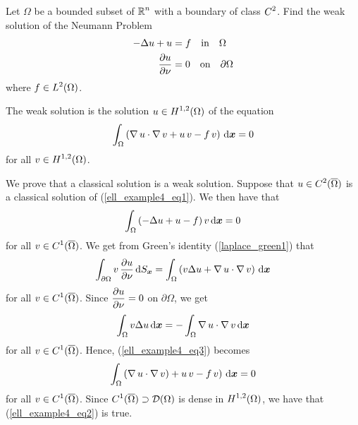 \begin{egg}
Let $\Omega$ be a bounded subset of $\displaystyle \mathbb{R}^n$ with a
boundary of class $\displaystyle C^2$.
Find the weak solution of the Neumann Problem          \label{eggNewmanBdr}
\begin{equation} \label{ell_example4_eq1}
\begin{split}
-\Delta u + u &= f \quad \text{in} \quad \Omega \\
\frac{\partial{u}}{\partial \nu} &= 0 \quad \text{on} \quad \partial \Omega
\end{split}
\end{equation}
where $\displaystyle f \in L^2(\Omega)$.

The weak solution is the solution $\displaystyle u\in H^{1,2}(\Omega)$ of
the equation
\begin{equation} \label{ell_example4_eq2}
\int_\Omega \left( \operatorname{\nabla} u \cdot \operatorname{\nabla} v
+ u\, v - f\, v \right) \,\mathrm{d}{{\bm{x}}} = 0
\end{equation}
for all $\displaystyle v \in H^{1,2}(\Omega)$.

We prove that a classical solution is a weak solution.  Suppose that
$\displaystyle u \in C^2(\overline{\Omega})$ is a classical solution of
(\ref{ell_example4_eq1}).  We then have that
\begin{equation} \label{ell_example4_eq3}
\int_\Omega \left( -\Delta u + u - f\right)
v \,\mathrm{d}{{\bm{x}}} = 0
\end{equation}
for all $\displaystyle v \in C^1(\overline{\Omega})$.
We get from Green's identity (\ref{laplace_green1}) that
\[
\int_{\partial \Omega} v\,\frac{\partial{u}}{\partial \nu} \,\mathrm{d}{S}_{{\bm{x}}}
= \int_\Omega \left( v \Delta u + \operatorname{\nabla} u \cdot \operatorname{\nabla} v \right)
\,\mathrm{d}{{\bm{x}}}
\]
for all $\displaystyle v \in C^1(\overline{\Omega})$.
Since $\displaystyle \frac{\partial{u}}{\partial \nu} = 0$ on $\partial \Omega$, we
get
\[
\int_\Omega  v \Delta u \,\mathrm{d}{{\bm{x}}} =
- \int_\Omega \operatorname{\nabla} u \cdot \operatorname{\nabla} v \,\mathrm{d}{{\bm{x}}}
\]
for all $\displaystyle v \in C^1(\overline{\Omega})$.
Hence, (\ref{ell_example4_eq3}) becomes
\[
\int_\Omega \left( \operatorname{\nabla} u \cdot \operatorname{\nabla} v) + u\, v
 - f\, v\right) \,\mathrm{d}{{\bm{x}}} = 0
\]
for all $\displaystyle v \in C^1(\overline{\Omega})$.
Since $\displaystyle C^1(\overline{\Omega}) \supset \mathcal{D}(\Omega)$ is
dense in $\displaystyle H^{1,2}(\Omega)$, we
have that (\ref{ell_example4_eq2}) is true.


\end{egg}
